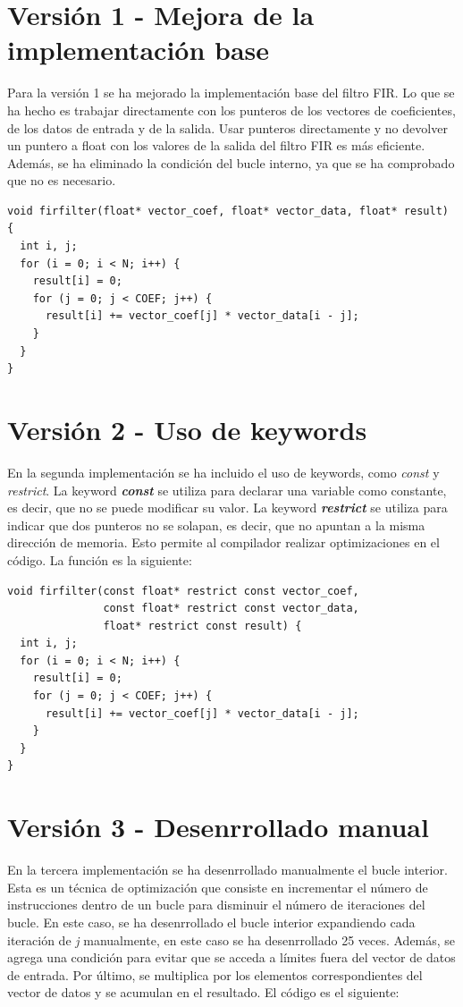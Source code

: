 \documentclass[11pt]{report}
\begin{document}
\section{Versión 1 - Mejora de la implementación base}
Para la versión 1 se ha mejorado la implementación base del filtro FIR. Lo que se ha hecho es trabajar directamente con los punteros de los vectores de coeficientes,
de los datos de entrada y de la salida. Usar punteros directamente y no devolver un puntero a float con los valores de la salida del filtro FIR es más eficiente. Además, 
se ha eliminado la condición del bucle interno, ya que se ha comprobado que no es necesario.

\begin{lstlisting}
void firfilter(float* vector_coef, float* vector_data, float* result) {
  int i, j;
  for (i = 0; i < N; i++) {
    result[i] = 0;
    for (j = 0; j < COEF; j++) {
      result[i] += vector_coef[j] * vector_data[i - j];
    }
  }
}
\end{lstlisting}

\newpage

\section{Versión 2 - Uso de keywords}
En la segunda implementación se ha incluido el uso de keywords, como \emph{const} y \emph{restrict}. La keyword \emph{\textbf{const}} se utiliza para declarar
una variable como constante, es decir, que no se puede modificar su valor. La keyword \emph{\textbf{restrict}} se utiliza para indicar que dos punteros no se solapan,
es decir, que no apuntan a la misma dirección de memoria. Esto permite al compilador realizar optimizaciones en el código. La función es la siguiente:

\begin{lstlisting}
void firfilter(const float* restrict const vector_coef,
               const float* restrict const vector_data,
               float* restrict const result) {
  int i, j;
  for (i = 0; i < N; i++) {
    result[i] = 0;
    for (j = 0; j < COEF; j++) {
      result[i] += vector_coef[j] * vector_data[i - j];
    }
  }
}
\end{lstlisting}

\newpage

\section{Versión 3 - Desenrrollado manual}
En la tercera implementación se ha desenrrollado manualmente el bucle interior. Esta es un técnica de optimización que consiste en incrementar
el número de instrucciones dentro de un bucle para disminuir el número de iteraciones del bucle. En este caso, se ha desenrrollado el bucle interior
expandiendo cada iteración de \emph{j} manualmente, en este caso se ha desenrrollado 25 veces. Además, se agrega una condición para evitar que se acceda
a límites fuera del vector de datos de entrada. Por último, se multiplica por los elementos correspondientes del vector de datos y se acumulan en el resultado.
El código es el siguiente:
\end{document}
